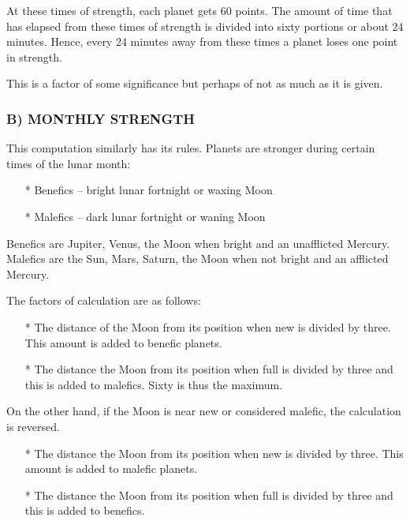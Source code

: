 At these times of strength, each planet gets 60 points. The amount of time that has elapsed from these times of strength is divided into sixty portions or about 24 minutes. Hence, every 24 minutes away from these times a planet loses one point in strength.

 

This is a factor of some significance but perhaps of not as much as it is given.

 

\subsubsection{B) MONTHLY STRENGTH}

 

This computation similarly has its rules. Planets are stronger during certain times of the lunar month:

 

\begin{enumerate}
\item[*] Benefics – bright lunar fortnight or waxing Moon
\item[*] Malefics – dark lunar fortnight or waning Moon
 \end{enumerate}

Benefics are Jupiter, Venus, the Moon when bright and an unafflicted Mercury. Malefics are the Sun, Mars, Saturn, the Moon when not bright and an afflicted Mercury.

 

The factors of calculation are as follows:

\begin{enumerate}
\item[*] The distance of the Moon from its position when new is divided by three. This amount is added to benefic planets.
\item[*] The distance the Moon from its position when full is divided by three and this is added to malefics. Sixty is thus the maximum.
  \end{enumerate}

On the other hand, if the Moon is near new or considered malefic, the calculation is reversed.

\begin{enumerate}
\item[*] The distance the Moon from its position when new is divided by three. This amount is added to malefic planets.
\item[*] The distance the Moon from its position when full is divided by three and this is added to benefics.
  \end{enumerate}

